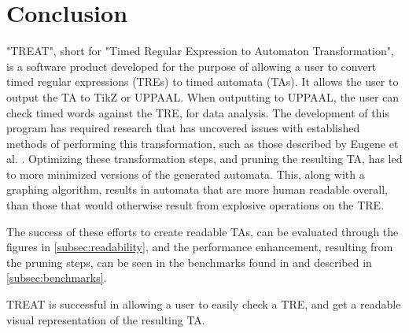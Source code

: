 \section{Conclusion}
"TREAT", short for "Timed Regular Expression to Automaton Transformation", is a software product developed for the purpose of allowing a user to convert timed regular expressions (TREs) to timed automata (TAs).
It allows the user to output the TA to TikZ or UPPAAL.
When outputting to UPPAAL, the user can check timed words against the TRE, for data analysis.
The development of this program has required research that has uncovered issues with established methods of performing this transformation, such as those described by Eugene et al. \cite{Eugene2001}.
Optimizing these transformation steps, and pruning the resulting TA, has led to more minimized versions of the generated automata. This, along with a graphing algorithm, results in automata that are more human readable overall, than those that would otherwise result from explosive operations on the TRE.

The success of these efforts to create readable TAs, can be evaluated through the figures in \cref{subsec:readability}, and the performance enhancement, resulting from the pruning steps, can be seen in the benchmarks found in %
and described in \cref{subsec:benchmarks}.

TREAT is successful in allowing a user to easily check a TRE, and get a readable visual representation of the resulting TA.
